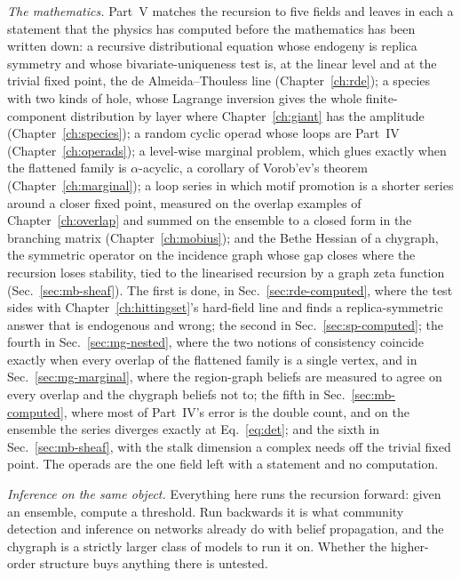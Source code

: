 \emph{The mathematics.} Part~V matches the recursion to five fields and
leaves in each a statement that the physics has computed before the
mathematics has been written down: a recursive distributional equation
whose endogeny is replica symmetry and whose bivariate-uniqueness test is,
at the linear level and at the trivial fixed point, the de
Almeida--Thouless line (Chapter~\ref{ch:rde});
a species with two kinds of hole, whose Lagrange inversion gives the
whole finite-component distribution by layer where Chapter~\ref{ch:giant}
has the amplitude (Chapter~\ref{ch:species}); a random cyclic operad whose
loops are Part~IV (Chapter~\ref{ch:operads}); a level-wise marginal
problem, which glues exactly when the flattened family is
$\alpha$-acyclic, a corollary of Vorob'ev's theorem (Chapter~\ref{ch:marginal});
a loop series in which motif promotion is a shorter series around a closer
fixed point, measured on the overlap examples of Chapter~\ref{ch:overlap}
and summed on the ensemble to a closed form in the branching matrix
(Chapter~\ref{ch:mobius}); and the Bethe Hessian of a chygraph, the
symmetric operator on the incidence graph whose gap closes where the
recursion loses stability, tied to the linearised recursion by a graph
zeta function (Sec.~\ref{sec:mb-sheaf}). The first is done, in
Sec.~\ref{sec:rde-computed}, where the test sides with
Chapter~\ref{ch:hittingset}'s hard-field line and finds a
replica-symmetric answer that is endogenous and wrong; the second in
Sec.~\ref{sec:sp-computed}; the fourth in Sec.~\ref{sec:mg-nested}, where
the two notions of consistency coincide exactly when every overlap of the
flattened family is a single vertex, and in Sec.~\ref{sec:mg-marginal},
where the region-graph beliefs are measured to agree on every overlap and
the chygraph beliefs not to; the fifth in Sec.~\ref{sec:mb-computed},
where most of Part~IV's error is the double count, and on the ensemble
the series diverges exactly at Eq.~\eqref{eq:det}; and the sixth in
Sec.~\ref{sec:mb-sheaf}, with the stalk dimension a complex needs off the
trivial fixed point. The operads are the one field left with a statement
and no computation.

\emph{Inference on the same object.} Everything here runs the recursion
forward: given an ensemble, compute a threshold. Run backwards it is what
community detection and inference on networks already do with belief
propagation, and the chygraph is a strictly larger class of models to run it on.
Whether the higher-order structure buys anything there is untested.


